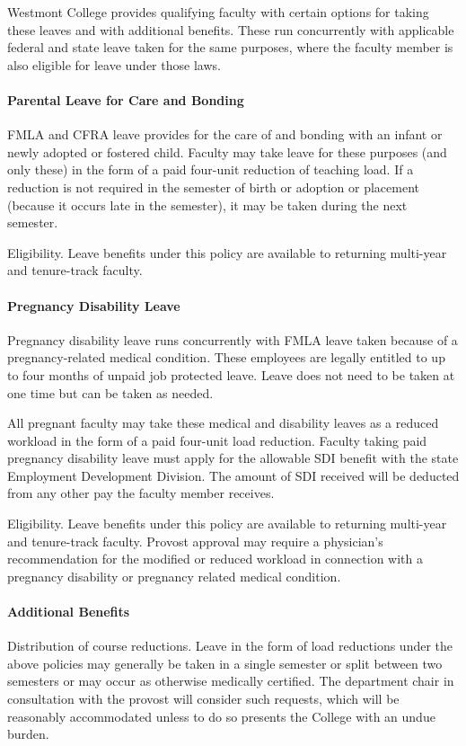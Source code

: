 			Westmont College provides qualifying faculty with certain options for taking these leaves and with additional benefits. These run concurrently with applicable federal and state leave taken for the same purposes, where the faculty member is also eligible for leave under those laws.

			\paragraph{Parental Leave for Care and Bonding}

				FMLA and CFRA leave provides for the care of and bonding with an infant or newly adopted or fostered child. Faculty may take leave for these purposes (and only these) in the form of a paid four-unit reduction of teaching load. If a reduction is not required in the semester of birth or adoption or placement (because it occurs late in the semester), it may be taken during the next semester.

				Eligibility. Leave benefits under this policy are available to returning multi-year and tenure-track faculty.

			\paragraph{Pregnancy Disability Leave}
				Pregnancy disability leave runs concurrently with FMLA leave taken because of a pregnancy-related medical condition. These employees are legally entitled to up to four months of unpaid job protected leave. Leave does not need to be taken at one time but can be taken as needed.

				All pregnant faculty may take these medical and disability leaves as a reduced workload in the form of a paid four-unit load reduction. Faculty taking paid pregnancy disability leave must apply for the allowable SDI benefit with the state Employment Development Division. The amount of SDI received will be deducted from any other pay the faculty member receives.

				Eligibility. Leave benefits under this policy are available to returning multi-year and tenure-track faculty. Provost approval may require a physician's recommendation for the modified or reduced workload in connection with a pregnancy disability or pregnancy related medical condition.

			\paragraph{Additional Benefits}
				Distribution of course reductions. Leave in the form of load reductions under the above policies may generally be taken in a single semester or split between two semesters or may occur as otherwise medically certified. The department chair in consultation with the provost will consider such requests, which will be reasonably accommodated unless to do so presents the College with an undue burden.

